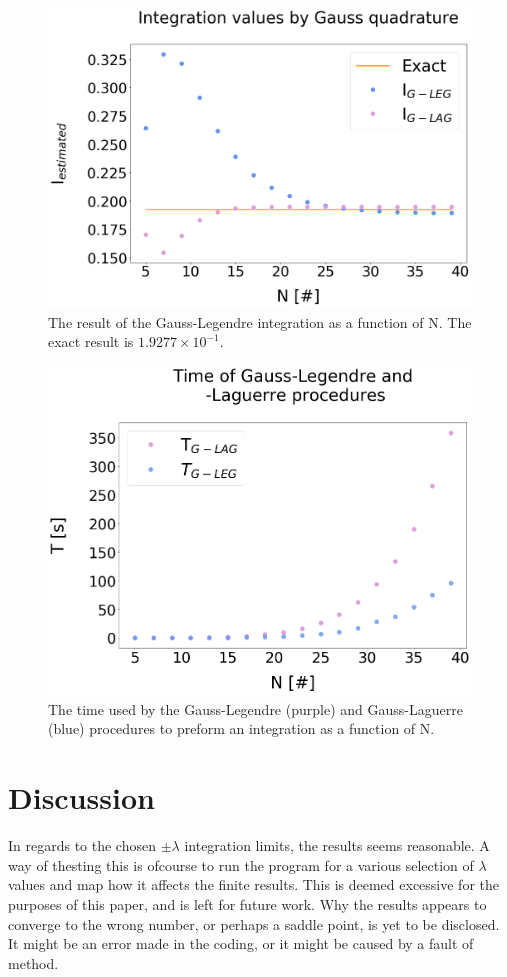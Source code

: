 \documentclass[%
reprint,
amsmath,amssymb,
aps,
]{revtex4-1}
\begin{document}
\begin{figure}[!h]
	\includegraphics[scale = 0.24]{Gauss_lagleg.png}
	\caption{\label{integrated_results} The result of the Gauss-Legendre integration as a function of N. The exact result is $1.9277\times 10^{-1}$. }
\end{figure}
\begin{figure}[!h]
	\includegraphics[scale = 0.24]{Gauss_time.png}
	\caption{\label{integrated_time} The time used by the Gauss-Legendre (purple) and Gauss-Laguerre (blue) procedures to preform an integration as a function of N. }
\end{figure}

\newpage 
\section{Discussion}
In regards to the chosen $\pm \lambda$ integration limits, the results seems reasonable. A way of thesting this is ofcourse to run the program for a various selection of $\lambda$ values and map how it affects the finite results. This is deemed excessive for the purposes of this paper, and is left for future work. 
Why the results appears to converge to the wrong number, or perhaps a saddle point, is yet to be disclosed. It might be an error made in the coding, or it might be caused by a fault of method. 
\end{document}
